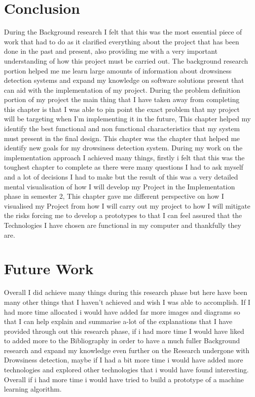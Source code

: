 \section{Conclusion}
During the Background research I felt that this was the most essential piece of work that had to do as it clarified everything about the project that has been done in the past and present, also providing me with a very important understanding of how this project must be carried out. The background research portion helped me me learn large amounts of information about drowsiness detection systems and expand my knowledge on software solutions present that can aid with the implementation of my project.
During the problem definition portion of my project the main thing that I have taken away from completing this chapter is that I was able to pin point the exact problem that my project will be targeting when I'm implementing it in the future, This chapter helped my identify the best functional and non functional characteristics that my system must present in the final design. This chapter was the chapter that helped me identify new goals for my drowsiness detection system.
During my work on the  implementation approach I achieved many things, firstly i felt that this was the toughest chapter to complete as there were many questions I had to ask myself and a lot of decisions I had to make but the result of this was a very detailed mental visualisation of how I will develop my Project in the Implementation phase in semester 2, This chapter gave me different perspective on how I visualised my Project from how I will carry out my project to how I will mitigate the risks forcing me to develop a prototypes to that I can feel assured that the Technologies I have chosen are functional in my computer and thankfully they are.


\section{Future Work}

Overall I did achieve many things during this research phase but here have been many other things that I haven't achieved and wish I was able to accomplish. If I had more time allocated i would have added far more images and diagrams so that I can help explain and summarise a-lot of the explanations that I have provided through out this research phase, if i had more time I would have liked to added more to the Bibliography  in order to have a much fuller Background research and expand my knowledge even further on the Research undergone with Drowsiness detection, maybe if I had a bit more time i would have added more technologies and explored other technologies that i would have found interesting. Overall if i had more time i would have tried to build a prototype of a machine learning algorithm.





